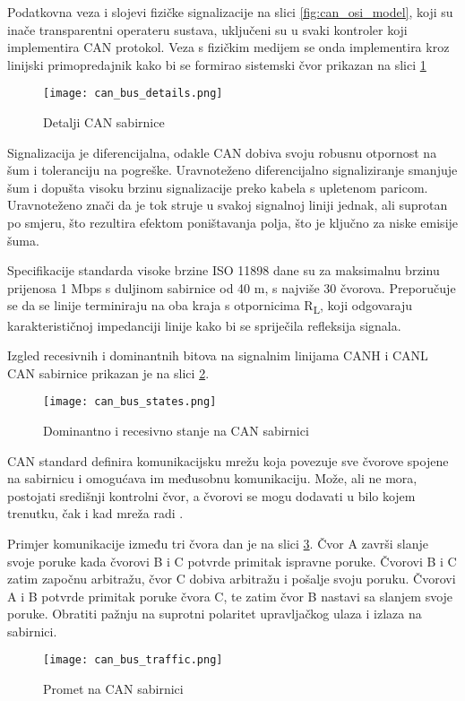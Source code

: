Podatkovna veza i slojevi fizičke signalizacije na slici \ref{fig:can_osi_model}, koji su inače transparentni operateru sustava, uključeni su u svaki kontroler koji implementira CAN protokol. Veza s fizičkim medijem se onda implementira kroz linijski primopredajnik kako bi se formirao sistemski čvor prikazan na slici \ref{fig:can_bus_details}
\begin{figure}[H]
	\centering
	\texttt{[image: can\_bus\_details.png]}
	\caption{Detalji CAN sabirnice \cite[str. 7]{can_manual}}
	\label{fig:can_bus_details}
\end{figure}
Signalizacija je diferencijalna, odakle CAN dobiva svoju robusnu otpornost na šum i toleranciju na pogreške. Uravnoteženo diferencijalno signaliziranje smanjuje šum i dopušta visoku brzinu signalizacije preko kabela s upletenom paricom. Uravnoteženo znači da je tok struje u svakoj signalnoj liniji jednak, ali suprotan po smjeru, što rezultira efektom poništavanja polja, što je ključno za niske emisije šuma.

Specifikacije standarda visoke brzine ISO 11898 dane su za maksimalnu brzinu prijenosa 1 Mbps s duljinom sabirnice od 40 m, s najviše 30 čvorova. Preporučuje se da se linije terminiraju na oba kraja s otpornicima R\textsubscript{L}, koji odgovaraju karakterističnoj impedanciji linije kako bi se spriječila refleksija signala.

Izgled recesivnih i dominantnih bitova na signalnim linijama CANH i CANL CAN sabirnice prikazan je na slici \ref{fig:can_bus_states}.
\begin{figure}[H]
	\centering
	\texttt{[image: can\_bus\_states.png]}
	\caption{Dominantno i recesivno stanje na CAN sabirnici \cite[str. 8]{can_manual}}
	\label{fig:can_bus_states}
\end{figure}

CAN standard definira komunikacijsku mrežu koja povezuje sve čvorove spojene na sabirnicu i omogućava im međusobnu komunikaciju. Može, ali ne mora, postojati središnji kontrolni čvor, a čvorovi se mogu dodavati u bilo kojem trenutku, čak i kad mreža radi .

Primjer komunikacije između tri čvora dan je na slici \ref{fig:can_bus_traffic}. Čvor A završi slanje svoje poruke kada čvorovi B i C potvrde primitak ispravne poruke. Čvorovi B i C zatim započnu arbitražu, čvor C dobiva arbitražu i pošalje svoju poruku. Čvorovi A i B potvrde primitak poruke čvora C, te zatim čvor B nastavi sa slanjem svoje poruke. Obratiti pažnju na suprotni polaritet upravljačkog ulaza i izlaza na sabirnici.
\begin{figure}[H]
	\centering
	\texttt{[image: can\_bus\_traffic.png]}
	\caption{Promet na CAN sabirnici \cite[str. 9]{can_manual}}
	\label{fig:can_bus_traffic}
\end{figure}

